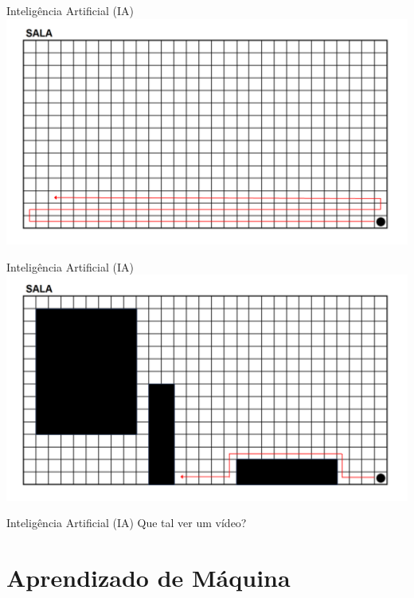 \documentclass{libs/ufc_format}
\begin{document}
\begin{frame}{Inteligência Artificial (IA)}
    \includegraphics[width=\textwidth]{media/SALA_caminho02_02}
\end{frame}

\begin{frame}{Inteligência Artificial (IA)}
    \includegraphics[width=\textwidth]{media/SALA_caminho03}
\end{frame}

\begin{frame}{Inteligência Artificial (IA)}
    \centering
    \large
    Que tal ver um vídeo? \cite{l22}
\end{frame}

\section{Aprendizado de Máquina}
\end{document}
